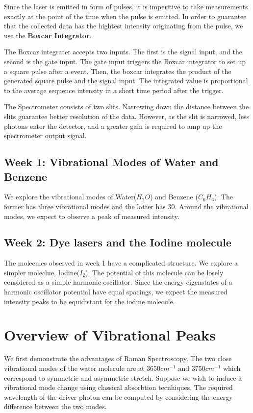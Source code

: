 \documentclass[10pt]{article}
\numberwithin{equation}{section}
\numberwithin{theorem}{section}
\numberwithin{proposition}{section}
\numberwithin{lemma}{section}
\numberwithin{corollary}{section}
\numberwithin{remark}{section}
\numberwithin{definition}{section}
\numberwithin{example}{section}
\numberwithin{conjecture}{section}
\numberwithin{question}{section}
\begin{document}
Since the laser is emitted in form of pulses, it is imperitive to 
take measurements exactly at the point of the time when the pulse is emitted. 
In order to guarantee that the collected data has the hightest intensity 
originating from the pulse, we use the \textbf{Boxcar Integrator}. 

The Boxcar integrater accepts two inputs. The first is the signal input, 
and the second is the gate input. The gate input triggers the Boxcar 
integrator to set up a square pulse after a event. Then, the boxcar 
integrates the product of the generated square pulse and the signal 
input. The integrated value is proportional to the average sequence 
intensity in a short time period after the trigger. 

The Spectrometer consists of two slits. Narrowing down the 
distance between the slits guarantee better resolution of the data. 
However, as the slit is narrowed, less photons enter the detector, and 
a greater gain is required to amp up the spectrometer output signal. 

\subsection{Week 1: Vibrational Modes of Water and Benzene}

We explore the vibrational modes 
of Water($H_2O$) and Benzene ($C_6H_6$). 
The former has three vibrational modes and the latter 
has 30. Around the vibrational modes, 
we expect to observe a peak of measured intensity. 


\subsection{Week 2: Dye lasers and the Iodine molecule}

The molecules observed in week 1 have a complicated 
structure. We explore a simpler moleclue, Iodine($I_2$). 
The potential of this molecule can be losely considered 
as a simple harmonic oscillator. Since the energy eigenstates 
of a harmonic oscillator potential have equal spacings, 
we expect the measured intensity peaks to be equidistant for the 
iodine molecule. 

\section{Overview of Vibrational Peaks}

We first demonstrate the advantages of Raman Spectroscopy. 
The two close vibrational modes of the water molecule are at 
$3650 cm^{-1}$ and $3750 cm^{-1}$ which correspond to symmetric and 
asymmetric stretch. Suppose we wish to induce a vibrational mode 
change using classical absorbtion tecnhiques. The required wavelength 
of the driver photon can be computed by considering the energy difference 
between the two modes. 
\end{document}
